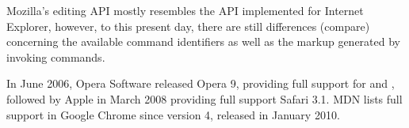 Mozilla's editing API mostly resembles the API implemented for Internet Explorer, however, to this present day, there are still differences (compare\cite{ad}\cite{am}) concerning the available command identifiers\cite{am}\cite{ad} as well as the markup generated by invoking commands\cite{ai}. 




In June 2006, Opera Software released Opera 9\cite{ap}, providing full support for and \cite{aq}, followed by Apple in March 2008\cite{ar} providing full support Safari 3.1\cite{caniuse_contenteditable}. MDN lists full support in Google Chrome since version 4\cite{as}, released in January 2010\cite{at}.






